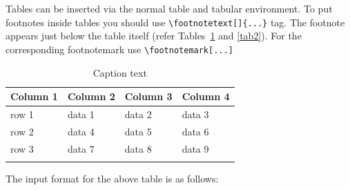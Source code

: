 \documentclass[sn-standardnature]{sn-jnl}%
\theoremstyle{thmstyleone}%
\theoremstyle{thmstyletwo}%
\theoremstyle{thmstylethree}%
\begin{document}
Tables can be inserted via the normal table and tabular environment. To put
footnotes inside tables you should use \verb+\footnotetext[]{...}+ tag.
The footnote appears just below the table itself (refer Tables~\ref{tab1} and \ref{tab2}). 
For the corresponding footnotemark use \verb+\footnotemark[...]+

\begin{table}[h]
\begin{center}
\begin{minipage}{174pt}
\caption{Caption text}\label{tab1}%
\begin{tabular}{@{}llll@{}}
\toprule
Column 1 & Column 2  & Column 3 & Column 4\\
\midrule
row 1    & data 1   & data 2  & data 3  \\
row 2    & data 4   & data 5\footnotemark[1]  & data 6  \\
row 3    & data 7   & data 8  & data 9\footnotemark[2]  \\
\botrule
\end{tabular}
\end{minipage}
\end{center}
\end{table}

\noindent
The input format for the above table is as follows:
\end{document}
